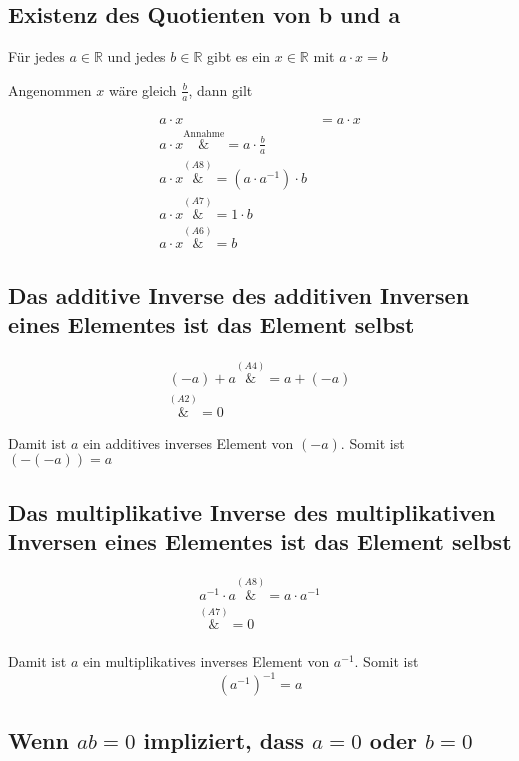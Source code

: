 \documentclass{article}
\begin{document}
\subsection{Existenz des Quotienten von b und a}
Für jedes $a \in \mathbb{R}$ und jedes $b \in \mathbb{R}$ gibt es ein $x \in \mathbb{R}$
mit $a \cdot x = b$

Angenommen $x$ wäre gleich $\frac{b}{a}$, dann gilt

\begin{align*}
  a \cdot x &= a \cdot x \\
  a \cdot x \overset{\text{Annahme}}&= a \cdot \frac{b}{a} \\ 
  a \cdot x \overset{\hyperref[a8]{(A8)}}&= (a \cdot a^{-1}) \cdot b \\ 
  a \cdot x \overset{\hyperref[a7]{(A7)}}&= 1 \cdot b \\
  a \cdot x \overset{\hyperref[a6]{(A6)}}&= b
\end{align*}

\subsection{Das additive Inverse des additiven Inversen eines Elementes ist das Element selbst}
\label{add_add_inv}

\begin{align*}
  (-a) + a \overset{\hyperref[a4]{(A4)}}&= a + (-a) \\
  \overset{\hyperref[a2]{(A2)}}&= 0
\end{align*}

Damit ist $a$ ein additives inverses Element von $(-a)$.
Somit ist $(-(-a)) = a$

\subsection{Das multiplikative Inverse des multiplikativen Inversen eines Elementes ist das Element selbst}

\begin{align*}
  a^{-1} \cdot a \overset{\hyperref[a8]{(A8)}}&= a \cdot a^{-1} \\
  \overset{\hyperref[a7]{(A7)}}&= 0 \\
\end{align*}

Damit ist $a$ ein multiplikatives inverses Element von $a^{-1}$.
Somit ist
\[
  (a^{-1})^{-1} = a
\]

\subsection{Wenn $ab = 0$ impliziert, dass  $a = 0$ oder $b = 0$}
\end{document}
